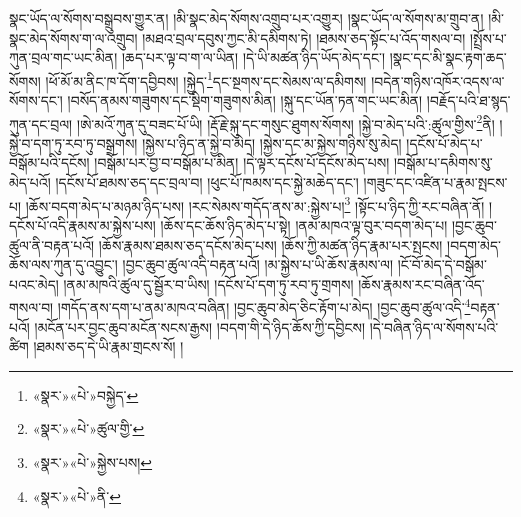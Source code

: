སྣང་ཡོད་ལ་སོགས་བསྒྲུབས་གྱུར་ན། །མི་སྣང་མེད་སོགས་འགྲུབ་པར་འགྱུར། །སྣང་ཡོད་ལ་སོགས་མ་གྲུབ་ན། །མི་སྣང་མེད་སོགས་ག་ལ་འགྲུབ། །མཐའ་བྲལ་དབུས་ཀྱང་མི་དམིགས་ཏེ། །ཐམས་ཅད་སྟོང་པ་འོད་གསལ་བ། །སྤྲོས་པ་ཀུན་བྲལ་གང་ཡང་མིན། །ཆད་པར་ལྟ་བ་ག་ལ་ཡིན། །དེ་ཡི་མཚན་ཉིད་ཡོད་མེད་དང་། །སྣང་དང་མི་སྣང་རྟག་ཆད་སོགས། །ཕོ་མོ་མ་ནིང་ཁ་དོག་དབྱིབས། །སྐྱེད་\footnote{«སྣར་»«པེ་»བསྐྱེད་}དང་སྔགས་དང་སེམས་ལ་དམིགས། །བདེན་གཉིས་འཁོར་འདས་ལ་སོགས་དང་། །བསོད་ནམས་གཟུགས་དང་སྡིག་གཟུགས་མིན། །སྐུ་དང་ཡོན་ཏན་གང་ཡང་མིན། །བརྗོད་པའི་ཐ་སྙད་ཀུན་དང་བྲལ། །ཨེ་མའོ་ཀུན་དུ་བཟང་པོ་ཡི། །རྡོ་རྗེ་སྐུ་དང་གསུང་ཐུགས་སོགས། །སྐྱེ་བ་མེད་པའི་:ཚུལ་གྱིས་\footnote{«སྣར་»«པེ་»ཚུལ་གྱི་}ནི། །སྐྱེ་བ་དག་ཏུ་རབ་ཏུ་བསྒྲགས། །སྐྱེས་པ་ཉིད་ན་སྐྱེ་བ་མེད། །སྐྱེས་དང་མ་སྐྱེས་གཉིས་སུ་མེད། །དངོས་པོ་མེད་པ་བསྒོམ་པའི་དངོས། །བསྒོམ་པར་བྱ་བ་བསྒོམ་པ་མིན། །དེ་ལྟར་དངོས་པོ་དངོས་མེད་པས། །བསྒོམ་པ་དམིགས་སུ་མེད་པའོ། །དངོས་པོ་ཐམས་ཅད་དང་བྲལ་བ། །ཕུང་པོ་ཁམས་དང་སྐྱེ་མཆེད་དང་། །གཟུང་དང་འཛིན་པ་རྣམ་སྤངས་པ། །ཆོས་བདག་མེད་པ་མཉམ་ཉིད་པས། །རང་སེམས་གདོད་ནས་མ་:སྐྱེས་པ།\footnote{«སྣར་»«པེ་»སྐྱེས་པས།} །སྟོང་པ་ཉིད་ཀྱི་རང་བཞིན་ནོ། །དངོས་པོ་འདི་རྣམས་མ་སྐྱེས་པས། །ཆོས་དང་ཆོས་ཉིད་མེད་པ་སྟེ། །ནམ་མཁའ་ལྟ་བུར་བདག་མེད་པ། །བྱང་ཆུབ་ཚུལ་ནི་བརྟན་པའོ། །ཆོས་རྣམས་ཐམས་ཅད་དངོས་མེད་པས། །ཆོས་ཀྱི་མཚན་ཉིད་རྣམ་པར་སྤངས། །བདག་མེད་ཆོས་ལས་ཀུན་དུ་འབྱུང་། །བྱང་ཆུབ་ཚུལ་འདི་བརྟན་པའོ། །མ་སྐྱེས་པ་ཡི་ཆོས་རྣམས་ལ། །ངོ་བོ་མེད་དེ་བསྒོམ་པའང་མེད། །ནམ་མཁའི་ཚུལ་དུ་སྦྱོར་བ་ཡིས། །དངོས་པོ་དག་ཏུ་རབ་ཏུ་གྲགས། །ཆོས་རྣམས་རང་བཞིན་འོད་གསལ་བ། །གདོད་ནས་དག་པ་ནམ་མཁའ་བཞིན། །བྱང་ཆུབ་མེད་ཅིང་རྟོག་པ་མེད། །བྱང་ཆུབ་ཚུལ་འདི་\footnote{«སྣར་»«པེ་»ནི་}བརྟན་པའོ། །མངོན་པར་བྱང་ཆུབ་མངོན་སངས་རྒྱས། །བདག་གི་དེ་ཉིད་ཆོས་ཀྱི་དབྱིངས། །དེ་བཞིན་ཉིད་ལ་སོགས་པའི་ཚིག །ཐམས་ཅད་དེ་ཡི་རྣམ་གྲངས་སོ། །
